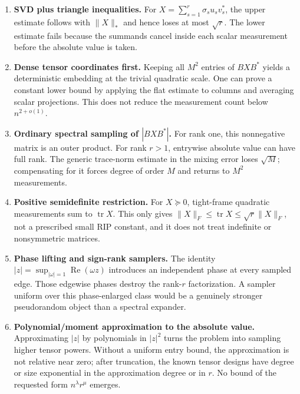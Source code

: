 \documentclass[11pt]{article}
\begin{document}
\begin{enumerate}[leftmargin=*,label=\textbf{Attempt \arabic*.}]
\item \textbf{SVD plus triangle inequalities.}
For $X=\sum_{s=1}^r\sigma_su_sv_s^*$, the upper estimate follows with
$\|X\|_*$ and hence loses at most $\sqrt r$.  The lower estimate fails because
the summands cancel inside each scalar measurement before the absolute value
is taken.

\item \textbf{Dense tensor coordinates first.}
Keeping all $M^2$ entries of $BXB^*$ yields a deterministic embedding at the
trivial quadratic scale.  One can prove a constant lower bound by applying
the flat estimate to columns and averaging scalar projections.  This does
not reduce the measurement count below $n^{2+o(1)}$.

\item \textbf{Ordinary spectral sampling of $|BXB^*|$.}
For rank one, this nonnegative matrix is an outer product.  For rank $r>1$,
entrywise absolute value can have full rank.  The generic trace-norm estimate
in the mixing error loses $\sqrt M$; compensating for it forces degree of
order $M$ and returns to $M^2$ measurements.

\item \textbf{Positive semidefinite restriction.}
For $X\succeq0$, tight-frame quadratic measurements sum to
$\operatorname{tr}X$.  This only gives
$\|X\|_F\leq\operatorname{tr}X\leq\sqrt r\|X\|_F$, not a prescribed small
RIP constant, and it does not treat indefinite or nonsymmetric matrices.

\item \textbf{Phase lifting and sign-rank samplers.}
The identity $|z|=\sup_{|\omega|=1}\operatorname{Re}(\omega z)$ introduces
an independent phase at every sampled edge.  Those edgewise phases destroy
the rank-$r$ factorization.  A sampler uniform over this phase-enlarged class
would be a genuinely stronger pseudorandom object than a spectral expander.

\item \textbf{Polynomial/moment approximation to the absolute value.}
Approximating $|z|$ by polynomials in $|z|^2$ turns the problem into sampling
higher tensor powers.  Without a uniform entry bound, the approximation is
not relative near zero; after truncation, the known tensor designs have
degree or size exponential in the approximation degree or in $r$.  No bound
of the requested form $n^\lambda r^\mu$ emerges.
\end{enumerate}
\end{document}
